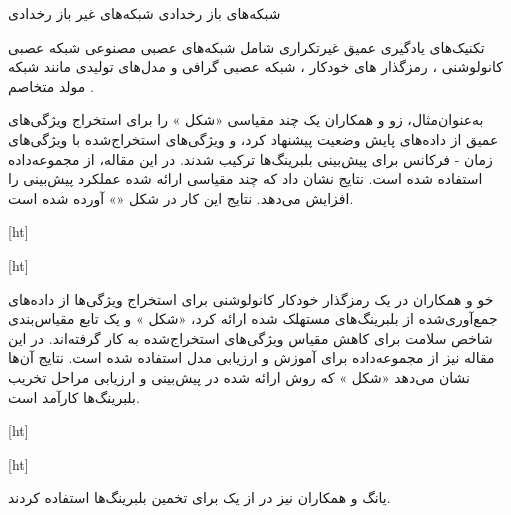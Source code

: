 
 شبکه‌های باز رخدادی
 شبکه‌های غیر باز رخدادی


تکنیک‌های یادگیری عمیق غیرتکراری شامل شبکه‌های عصبی مصنوعی 
شبکه عصبی کانولوشنی ، رمزگذار های خودکار ، شبکه عصبی گرافی  و مدل‌های تولیدی مانند شبکه مولد متخاصم .


به‌عنوان‌مثال، زو و همکاران  یک  چند مقیاسی «شکل » را برای استخراج ویژگی‌های عمیق از داده‌های پایش وضعیت پیشنهاد کرد، و ویژگی‌های استخراج‌شده با ویژگی‌های زمان - فرکانس برای پیش‌بینی  بلبرینگ‌ها ترکیب شدند. در این مقاله، از مجموعه‌داده  استفاده شده است. نتایج نشان داد که  چند مقیاسی ارائه شده عملکرد پیش‌بینی را افزایش می‌دهد. نتایج این کار در شکل «» آورده شده است.


[ht]




[ht]


خو و همکاران در  یک رمزگذار خودکار کانولوشنی برای استخراج ویژگی‌ها از داده‌های جمع‌آوری‌شده از بلبرینگ‌های مستهلک شده ارائه کرد، «شکل » و یک تابع مقیاس‌بندی شاخص سلامت برای کاهش مقیاس ویژگی‌های استخراج‌شده به کار گرفته‌اند. در این مقاله نیز از مجموعه‌داده  برای آموزش و ارزیابی مدل استفاده شده است. نتایج آن‌ها نشان می‌دهد «شکل » که روش ارائه شده در پیش‌بینی  و ارزیابی مراحل تخریب بلبرینگ‌ها کارآمد است. 


[ht]



[ht]


یانگ و همکاران نیز در  از یک  برای تخمین  بلبرینگ‌ها استفاده کردند.



